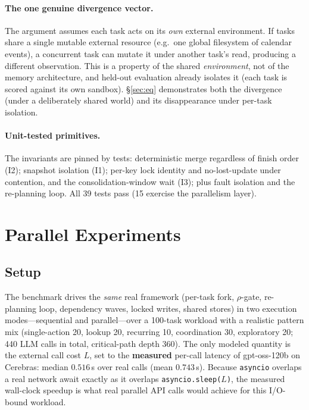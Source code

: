 \documentclass[10pt,twocolumn]{article}
\newcommand{\code}[1]{\texttt{\small #1}}
\begin{document}
\paragraph{The one genuine divergence vector.} The argument assumes each task acts
on its \emph{own} external environment. If tasks share a single mutable external
resource (e.g.\ one global filesystem of calendar events), a concurrent task can
mutate it under another task's read, producing a different observation. This is a
property of the shared \emph{environment}, not of the memory architecture, and
held-out evaluation already isolates it (each task is scored against its own
sandbox). \S\ref{sec:eq} demonstrates both the divergence (under a deliberately
shared world) and its disappearance under per-task isolation.

\paragraph{Unit-tested primitives.} The invariants are pinned by tests:
deterministic merge regardless of finish order (\textsc{I2}); snapshot isolation
(\textsc{I1}); per-key lock identity and no-lost-update under contention, and the
consolidation-window wait (\textsc{I3}); plus fault isolation and the re-planning
loop. All 39 tests pass (15 exercise the parallelism layer).

\section{Parallel Experiments}\label{sec:par-results}
\subsection{Setup}
The benchmark drives the \emph{same} real framework (per-task fork, $\rho$-gate,
re-planning loop, dependency waves, locked writes, shared stores) in two execution
modes---sequential and parallel---over a 100-task workload with a realistic pattern
mix (single-action 20, lookup 20, recurring 10, coordination 30, exploratory 20;
440 LLM calls in total, critical-path depth 360). The only modeled quantity is the
external call cost $L$, set to the \textbf{measured} per-call latency of
gpt-oss-120b on Cerebras: median $0.516$\,s over real calls (mean $0.743$\,s).
Because \code{asyncio} overlaps a real network await exactly as it overlaps
\code{asyncio.sleep($L$)}, the measured wall-clock speedup is what real parallel
API calls would achieve for this I/O-bound workload.
\end{document}
